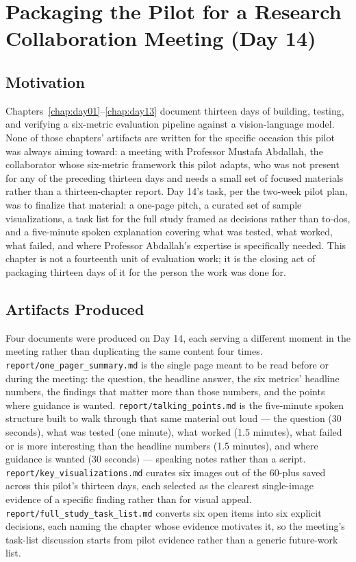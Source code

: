 \chapter{Packaging the Pilot for a Research Collaboration Meeting (Day 14)}
\label{chap:day14}

\section{Motivation}

Chapters~\ref{chap:day01}--\ref{chap:day13} document thirteen days of building, testing, and
verifying a six-metric evaluation pipeline against a vision-language model. None of those
chapters' artifacts are written for the specific occasion this pilot was always aiming toward:
a meeting with Professor Mustafa Abdallah, the collaborator whose six-metric framework this
pilot adapts, who was not present for any of the preceding thirteen days and needs a small set
of focused materials rather than a thirteen-chapter report. Day 14's task, per the two-week
pilot plan, was to finalize that material: a one-page pitch, a curated set of sample
visualizations, a task list for the full study framed as decisions rather than to-dos, and a
five-minute spoken explanation covering what was tested, what worked, what failed, and where
Professor Abdallah's expertise is specifically needed. This chapter is not a fourteenth unit of
evaluation work; it is the closing act of packaging thirteen days of it for the person the work
was done for.

\section{Artifacts Produced}

Four documents were produced on Day 14, each serving a different moment in the meeting rather
than duplicating the same content four times. \texttt{report/one\_pager\_summary.md} is the
single page meant to be read before or during the meeting: the question, the headline answer,
the six metrics' headline numbers, the findings that matter more than those numbers, and the
points where guidance is wanted. \texttt{report/talking\_points.md} is the five-minute spoken
structure built to walk through that same material out loud --- the question (30 seconds), what
was tested (one minute), what worked (1.5 minutes), what failed or is more interesting than the
headline numbers (1.5 minutes), and where guidance is wanted (30 seconds) --- speaking notes
rather than a script. \texttt{report/key\_visualizations.md} curates six images out of the
60-plus saved across this pilot's thirteen days, each selected as the clearest single-image
evidence of a specific finding rather than for visual appeal. \texttt{report/full\_study\_task\_list.md}
converts six open items into six explicit decisions, each naming the chapter whose evidence
motivates it, so the meeting's task-list discussion starts from pilot evidence rather than a
generic future-work list.

